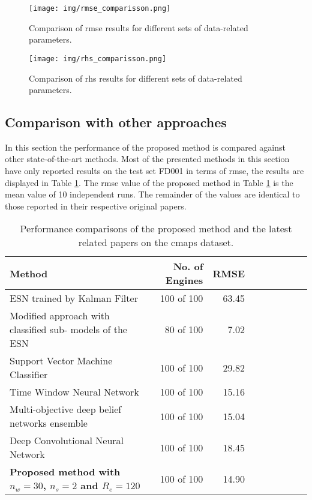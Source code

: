 \begin{figure}[!htb]
\centering
\texttt{[image: img/rmse\_comparisson.png]}
\caption{Comparison of \gls{rmse} results for different sets of data-related parameters.}
\label{fig:scores_rmse}
\end{figure}

\begin{figure}[!htb]
\centering
\texttt{[image: img/rhs\_comparisson.png]}
\caption{Comparison of \gls{rhs} results for different sets of data-related parameters.}
\label{fig:scores_rhs}
\end{figure}

\subsection{Comparison with other approaches}

In this section the performance of the proposed method is compared against other state-of-the-art methods. Most of the presented methods in this section have only reported results on the test set FD001 in terms of \gls{rmse}, the results are displayed in Table \ref{table:results_comparison}. The \gls{rmse} value of the proposed method in Table \ref{table:results_comparison} is the mean value of 10 independent runs. The remainder of the values are identical to those reported in their respective original papers.

\begin{table}[!htb]
\centering
\begin{tabular}{l | r r r r | r r r r}
	\hline	
	Method & No. of Engines & RMSE \\
  	\hline
  	ESN trained by Kalman Filter \cite{Peng2012} & 100 of 100 & 63.45\\
  	Modified approach with classified sub- models of the ESN \cite{Peng2012} & 80 of 100 & 7.02\\
  	Support Vector Machine Classifier \cite{Louen2013} & 100 of 100 & 29.82\\
  	Time Window Neural Network \cite{Lim2016} & 100 of 100 & 15.16\\
  	Multi-objective deep belief networks ensemble \cite{Zhang2016} & 100 of 100 & 15.04\\
  	Deep Convolutional Neural Network \cite{Babu2016} & 100 of 100 & 18.45\\
  	\textbf{Proposed method with $n_w = 30$, $n_s=2$ and $R_e = 120$} & 100 of 100 & 14.90\\
  	\hline
\end{tabular}
\caption{Performance comparisons of the proposed method and the latest related papers on the \gls{cmaps} dataset.}
\label{table:results_comparison}
\end{table}

